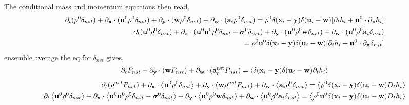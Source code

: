 \documentclass[11pt]{My_preprint}
\begin{document}
The conditional mass and momentum equations then read,
\begin{align*}
    \partial_t (\rho^0 \delta_{nst}) 
    + {\partial_\textbf{x}} \cdot (\textbf{u}^0 \rho^0 \delta_{nst} ) 
    + {\partial_\textbf{y}} \cdot (\textbf{w}   \rho^0 \delta_{nst})
    + {\partial_\textbf{w}} \cdot (\textbf{a}_i \rho^0 \delta_{nst})
    = 
    \rho^0 \delta(\textbf{x}_i -\textbf{y}) \delta(\textbf{u}_i - \textbf{w}) 
    [\partial_t h_i 
    +  \textbf{u}^0 \cdot {\partial_\textbf{x}} h_i] 
    \\
    \partial_t (\textbf{u}^0 \rho^0 \delta_{nst}) 
    + {\partial_\textbf{x}} \cdot (\textbf{u}^0 \textbf{u}^0 \rho^0 \delta_{nst} - \bm\sigma^0 \delta_{nst}) 
    + {\partial_\textbf{y}} \cdot (\textbf{u}^0\rho^0 \textbf{w}   \delta_{nst}) 
    + {\partial_\textbf{w}} \cdot (\textbf{u}^0\rho^0 \textbf{a}_i \delta_{nst}) \\
    = \rho^0 \textbf{u}^0  
    \delta(\textbf{x}_i -\textbf{y}) \delta(\textbf{u}_i - \textbf{w}) 
    [
        \partial_t h_i 
        + \textbf{u}^0\cdot {\partial_\textbf{x}}\delta_{nst}
        ]
    \\
\end{align*}
ensemble average the eq for $\delta_{nst}$ gives, 
\begin{align*}
    \partial_t P_{nst}
    + {\partial_\textbf{y}} \cdot (\textbf{w} P_{nst})
    + {\partial_\textbf{w}} \cdot (\textbf{a}_p^\text{nst}  P_{nst})
    = 
    \left<\delta(\textbf{x}_i -\textbf{y}) \delta(\textbf{u}_i - \textbf{w}) \partial_t h_i\right>
\end{align*}
\begin{align*}
    \partial_t (\rho^{nst} P_{nst}) 
    + {\partial_\textbf{x}} \cdot \left<\textbf{u}^0 \rho^0 \delta_{nst} \right>
    + {\partial_\textbf{y}} \cdot (\textbf{w}   \rho^{nst} P_{nst})
    + {\partial_\textbf{w}} \cdot \left<\textbf{a}_i \rho^0 \delta_{nst}\right>
    = 
    \left<\rho^0 \delta(\textbf{x}_i -\textbf{y}) \delta(\textbf{u}_i - \textbf{w}) D_t h_i \right>
    \\
    \partial_t \left<\textbf{u}^0 \rho^0 \delta_{nst}\right>
    + {\partial_\textbf{x}} \cdot \left<\textbf{u}^0 \textbf{u}^0 \rho^0 \delta_{nst} - \bm\sigma^0 \delta_{nst}\right>
    + {\partial_\textbf{y}} \cdot \left<\textbf{u}^0\rho^0 \textbf{w}   \delta_{nst} \right>
    + {\partial_\textbf{w}} \cdot \left<\textbf{u}^0\rho^0 \textbf{a}_i \delta_{nst} \right>
    = \left<\rho^0 \textbf{u}^0  
    \delta(\textbf{x}_i -\textbf{y}) \delta(\textbf{u}_i - \textbf{w})D_t h_i \right>
    \\
\end{align*}
\end{document}
